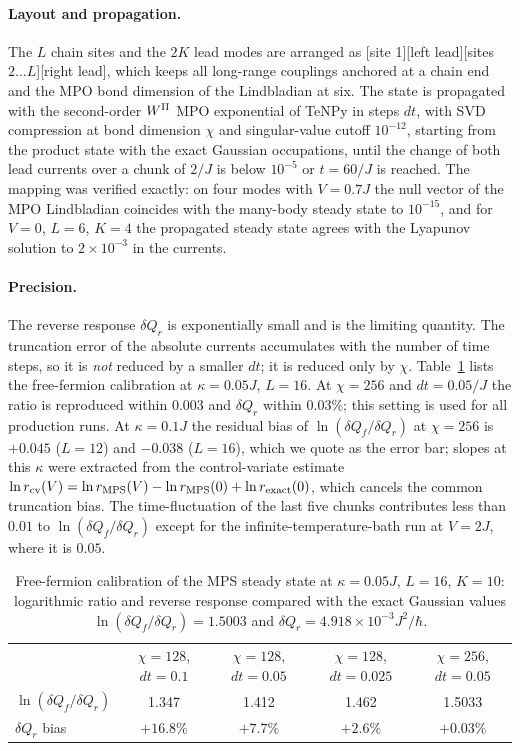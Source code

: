 \documentclass[reprint,aps,prl,superscriptaddress,nofootinbib,floatfix]{revtex4-2}
\newcommand{\dQ}{\delta Q}
\begin{document}
\paragraph{Layout and propagation.}
The $L$ chain sites and the $2K$ lead modes are arranged as [site 1][left lead][sites $2\dots L$][right lead], which keeps all long-range couplings anchored at a chain end and the MPO bond dimension of the Lindbladian at six. The state is propagated with the second-order $W^{\rm II}$ MPO exponential of TeNPy in steps $dt$, with SVD compression at bond dimension $\chi$ and singular-value cutoff $10^{-12}$, starting from the product state with the exact Gaussian occupations, until the change of both lead currents over a chunk of $2/J$ is below $10^{-5}$ or $t=60/J$ is reached. The mapping was verified exactly: on four modes with $V=0.7J$ the null vector of the MPO Lindbladian coincides with the many-body steady state to $10^{-15}$, and for $V=0$, $L=6$, $K=4$ the propagated steady state agrees with the Lyapunov solution to $2\times10^{-3}$ in the currents.

\paragraph{Precision.}
The reverse response $\dQ_r$ is exponentially small and is the limiting quantity. The truncation error of the absolute currents accumulates with the number of time steps, so it is \emph{not} reduced by a smaller $dt$; it is reduced only by $\chi$. Table~\ref{tab:chi} lists the free-fermion calibration at $\kappa=0.05J$, $L=16$. At $\chi=256$ and $dt=0.05/J$ the ratio is reproduced within $0.003$ and $\dQ_r$ within $0.03\%$; this setting is used for all production runs. At $\kappa=0.1J$ the residual bias of $\ln(\dQ_f/\dQ_r)$ at $\chi=256$ is $+0.045$ ($L=12$) and $-0.038$ ($L=16$), which we quote as the error bar; slopes at this $\kappa$ were extracted from the control-variate estimate $\ln r_{\rm cv}(V)=\ln r_{\rm MPS}(V)-\ln r_{\rm MPS}(0)+\ln r_{\rm exact}(0)$, which cancels the common truncation bias. The time-fluctuation of the last five chunks contributes less than $0.01$ to $\ln(\dQ_f/\dQ_r)$ except for the infinite-temperature-bath run at $V=2J$, where it is $0.05$.

\begin{table}[h]
\caption{Free-fermion calibration of the MPS steady state at $\kappa=0.05J$, $L=16$, $K=10$: logarithmic ratio and reverse response compared with the exact Gaussian values $\ln(\dQ_f/\dQ_r)=1.5003$ and $\dQ_r=4.918\times10^{-3}J^2/\hbar$.}
\label{tab:chi}
\begin{ruledtabular}
\begin{tabular}{lcccc}
 & $\chi=128$, $dt=0.1$ & $\chi=128$, $dt=0.05$ & $\chi=128$, $dt=0.025$ & $\chi=256$, $dt=0.05$ \\
\colrule
$\ln(\dQ_f/\dQ_r)$ & 1.347 & 1.412 & 1.462 & 1.5033 \\
$\dQ_r$ bias & $+16.8\%$ & $+7.7\%$ & $+2.6\%$ & $+0.03\%$ \\
\end{tabular}
\end{ruledtabular}
\end{table}
\end{document}
